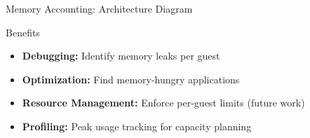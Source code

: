 \documentclass[aspectratio=169, 10pt]{beamer}
\begin{document}
\begin{frame}{Memory Accounting: Architecture Diagram}
    \vspace{0.3cm}
    \begin{exampleblock}{Benefits}
        \begin{itemize}\setlength{\itemsep}{2pt}
            \item \textbf{Debugging:} Identify memory leaks per guest
            \item \textbf{Optimization:} Find memory-hungry applications
            \item \textbf{Resource Management:} Enforce per-guest limits (future work)
            \item \textbf{Profiling:} Peak usage tracking for capacity planning
        \end{itemize}
    \end{exampleblock}
\end{frame}
\end{document}
